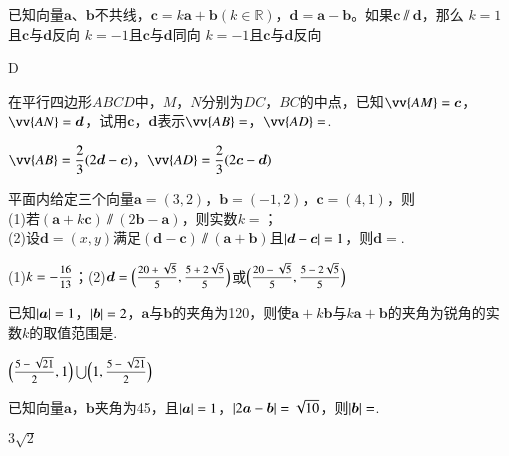 \begin{Theorem}[平面向量基本定理]
\begin{exercise}
    \item%
      已知向量$\bm a$、$\bm b$不共线，$\bm c=k\bm a+\bm b({k\in\mathbb{R}})$，$\bm d=\bm a-\bm b$。如果$\bm c\varparallel \bm d$，那么\xz
        {$k=1$且$\bm c$与$\bm d$反向}
        {$k=-1$且$\bm c$与$\bm d$同向}
        {$k=-1$且$\bm c$与$\bm d$反向}
      \begin{answer}
        D
      \end{answer}
    \item%
      在平行四边形$ABCD$中，$M$，$N$分别为$DC$，$BC$的中点，已知$\vv{AM}=\bm c$，$\vv{AN}=\bm d$，试用$\bm c$，$\bm d$表示$\vv{AB}=$\tk，$\vv{AD}=$\tk.
      \begin{answer}
        $\vv{AB}=\dfrac{2}3(2\bm d-\bm c)$，$\vv{AD}=\dfrac{2}3(2\bm c-\bm d)$
      \end{answer}
    \item%
      平面内给定三个向量$\bm a=(3,2)$，$\bm b=(-1,2)$，$\bm c=(4,1)$，则\\
      (1)若$(\bm a+k\bm c)\varparallel(2\bm b-\bm a)$，则实数$k=$\tk；\\
      (2)设$\bm d=(x,y)$满足$(\bm d-\bm c) \varparallel (\bm a+\bm b)$且$\left| \bm d-\bm c \right|=1$，则$\bm d=$\tk.
      \begin{answer}
        (1)$k=-\mfrac{16}{13}$；(2)$\bm d=\Bigl(\mfrac{20+\sqrt{5}}5,\mfrac{5+2\sqrt{5}}5\Bigr)$或$\Bigl(\mfrac{20-\sqrt{5}}5,\mfrac{5-2\sqrt{5}}5\Bigr)$
  \end{answer}
    \item%
      已知$\left| \bm a \right|=1$，$\left| \bm b \right|=2$，$\bm a$与$\bm b$的夹角为120\degree，则使$\bm a+k\bm b$与$k\bm a+\bm b$的夹角为锐角的实数$k$的取值范围是\tk.
      \begin{answer}
        $\Bigl(\mfrac{5-\sqrt{21}}2,1\Bigr) \bigcup \Bigl(1,\mfrac{5-\sqrt{21}}2 \Bigr)$
      \end{answer}
    \item%
      已知向量$\bm a$，$\bm b$夹角为45\degree，且$\left| \bm a \right|=1$，$\left| 2\bm a-\bm b \right|=\sqrt{10}$，则$\left| \bm b \right|=$\tk.
      \begin{answer}
        $3\sqrt{2}$

\end{answer}
\end{exercise}
\end{Theorem}
